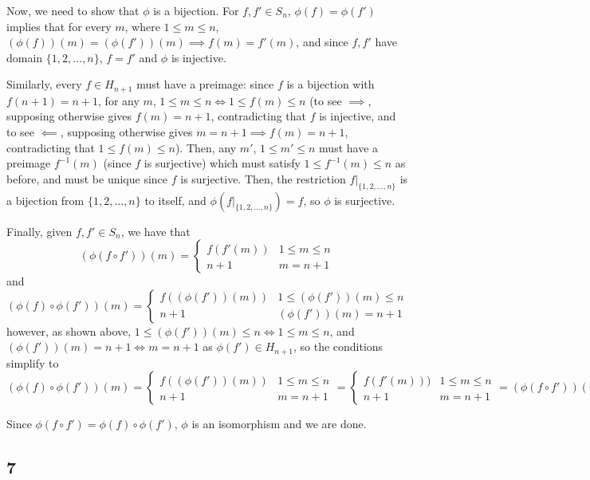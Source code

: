 \documentclass[12pt,letterpaper]{article}
\theoremstyle{definition}
\begin{document}
Now, we need to show that $\phi$ is a bijection. For $f, f' \in S_{n}$, $\phi(f) = \phi(f')$ implies that for every $m$, where $1 \leq m \leq n$, $(\phi(f))(m) = (\phi(f'))(m) \implies f(m) = f'(m)$, and since $f, f'$ have domain $\{1, 2, \dots, n\}$, $f = f'$ and $\phi$ is injective.

Similarly, every $f \in H_{n+1}$ must have a preimage: since $f$ is a bijection with $f(n+1) = n+1$, for any $m$, $1 \leq m \leq n \iff 1 \leq f(m) \leq n$ (to see $\implies$, supposing otherwise gives $f(m) = n + 1$, contradicting that $f$ is injective, and to see $\impliedby$, supposing otherwise gives $m = n + 1 \implies f(m) = n + 1$, contradicting that $1 \leq f(m) \leq n$). Then, any $m'$, $1 \leq m' \leq n$ must have a preimage $f^{-1}(m)$ (since $f$ is surjective) which must satisfy $1 \leq f^{-1}(m) \leq n$ as before, and must be unique since $f$ is surjective. Then, the restriction $f|_{\{1,2,\dots,n\}}$ is a bijection from $\{1,2,\dots,n\}$ to itself, and $\phi(f|_{\{1,2,\dots,n\}}) = f$, so $\phi$ is surjective.

Finally, given $f,f' \in S_{n}$, we have that
\[
  (\phi(f \circ f'))(m) = \begin{cases}
    f(f'(m)) & 1 \leq m \leq n \\
    n + 1 & m = n + 1
  \end{cases}
\]
and
\[
  (\phi(f) \circ \phi(f'))(m) = \begin{cases}
    f((\phi(f'))(m)) & 1 \leq (\phi(f'))(m) \leq n \\
    n + 1 & (\phi(f'))(m) = n + 1
  \end{cases}
\]
however, as shown above, $1 \leq (\phi(f'))(m) \leq n \iff 1 \leq m \leq n$, and $(\phi(f'))(m) = n + 1 \iff m = n + 1$ as $\phi(f') \in H_{n+1}$, so the conditions simplify to
\[
  (\phi(f) \circ \phi(f'))(m) = \begin{cases}
    f((\phi(f'))(m)) & 1 \leq m \leq n \\
    n + 1 & m = n + 1
  \end{cases} = \begin{cases}
    f(f'(m))) & 1 \leq m \leq n \\
    n + 1 & m = n + 1
  \end{cases} = (\phi(f \circ f'))(m)
\]

Since $\phi(f \circ f') = \phi(f) \circ \phi(f')$, $\phi$ is an isomorphism and we are done.

\subsection*{7}
\end{document}
